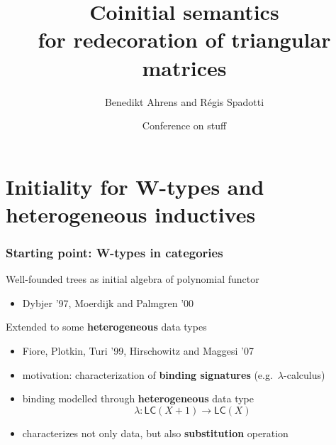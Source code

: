 \documentclass[
serif,
mathsans,
]
{beamer}
\title[Coinitial semantics for redecoration]{Coinitial semantics \\ for redecoration of triangular matrices}
\author{Benedikt Ahrens and R\'egis Spadotti}
\date[put date here]{Conference on stuff}
\institute[IRIT] %
{%
  Institut de Recherche en Informatique de Toulouse\\
   Universit\'e Paul Sabatier\\ ~ \\
}
\newcommand{\LC}{\mathsf{LC}}
\newcommand{\fat}[1]{\textbf{#1}}
\begin{document}
\begin{frame}
\titlepage

\end{frame}

\section{Initiality for W-types and heterogeneous inductives}

\begin{frame}
 \frametitle{Starting point: W-types in categories}
 
 \begin{block}{Well-founded trees as initial algebra of polynomial functor}
  \begin{itemize}
   \item Dybjer '97, Moerdijk and Palmgren '00
  \end{itemize}
 \end{block}

 \begin{block}{Extended to some \fat{heterogeneous} data types}
 
  \begin{itemize}
    \item Fiore, Plotkin, Turi '99, Hirschowitz and Maggesi '07
    \item motivation: characterization of \fat{binding signatures} (e.g.\ $\lambda$-calculus)
    \item binding modelled through \fat{heterogeneous} data type
           \[  \lambda : \LC(X + 1) \to \LC(X) \]
    \item characterizes not only data, but also \fat{substitution} operation
  \end{itemize}
 \end{block} 
\end{frame}
\end{document}
